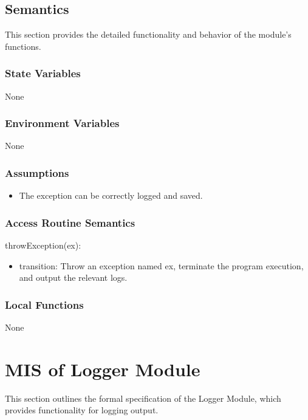 \documentclass[12pt, titlepage]{article}
\begin{document}
\subsection{Semantics}

This section provides the detailed functionality and behavior of the module’s
functions.

\subsubsection{State Variables}

None

\subsubsection{Environment Variables}

None

\subsubsection{Assumptions}

\begin{itemize}
\item The exception can be correctly logged and saved.
\end{itemize}

\subsubsection{Access Routine Semantics}

\noindent throwException(ex):
\begin{itemize}
\item transition: Throw an exception named ex, terminate the program execution,
and output the relevant logs.
\end{itemize}

\subsubsection{Local Functions}

None

\newpage

\section{MIS of Logger Module} \label{MIS_Logger}

This section outlines the formal specification of the Logger Module, which
provides functionality for logging output.
\end{document}

